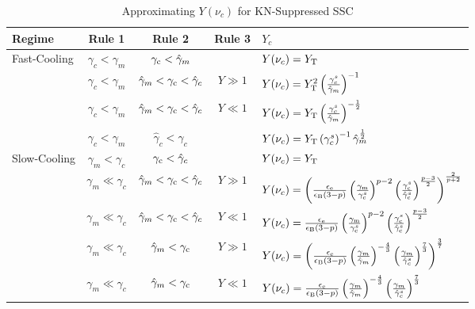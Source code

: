 \documentclass[fleqn,usenatbib]{mnras}
\begin{document}
\begin{table}
\centering
\caption{Approximating $Y(\nu_{c})$ for KN-Suppressed SSC}
\label{tab:Yckn}
\begin{tabular}{lcccl}
\hline
Regime&Rule 1&Rule 2&Rule 3&$Y_c$\\
\hline
Fast-Cooling &$ \gamma_{c} < \gamma_{m} $& $ \gamma_{\rm c} < \hat{\gamma}_{m} $& \ & $ Y(\nu_{c}) = Y_{\rm T}$\\
&$ \gamma_{c} < \gamma_{m} $ & $\hat{\gamma}_{m} < \gamma_{\rm c} < \hat{\gamma}_{c} $ & $ Y \gg 1$ & $ Y(\nu_{c}) = Y_{\rm T}^2 \left(\frac{\gamma_{c}^s}{\hat{\gamma}_{m}}\right)^{-1}$\\
&$ \gamma_{c} < \gamma_{m} $&$\hat{\gamma}_{m} < \gamma_{\rm c} < \hat{\gamma}_{c} $&$ Y \ll 1$&$ Y(\nu_{c}) = Y_{\rm T} \left(\frac{\gamma_{c}^s}{\hat{\gamma}_{m}}\right)^{-\frac{1}{2}}$\\
&$ \gamma_{c} < \gamma_{m}$ &$ \hat{\gamma}_{c} < \gamma_{c}$ & \ &$Y (\nu_{c}) = Y_{\rm T}\left(\gamma_{c}^s\right)^{-1}\hat{\gamma}_{m}^{\frac{1}{2}}$ \\
Slow-Cooling &$ \gamma_{m} < \gamma_{c}$ &$ \gamma_{\rm c} < \hat{\gamma}_{c}$& \ &$ Y(\nu_{c}) = Y_{\rm T} $\\
&$ \gamma_{m} \ll \gamma_{c}$ &$\hat{\gamma}_{m} < \gamma_{\rm c} < \hat{\gamma}_{c}$ &$Y\gg1$ &$Y(\nu_{c})=\left(\frac{\epsilon_{\rm e}}{\epsilon_{\rm B}(3-p)}\left(\frac{\gamma_{\rm m}}{\gamma_{\rm c}^s}\right)^{p-2}\left(\frac{\gamma_{\rm c}^s}{\hat{\gamma}_{\rm c}^s}\right)^{\frac{p-3}{2}}\right)^\frac{2}{p+2}$ \\
&$ \gamma_{m} \ll \gamma_{c}$ &$\hat{\gamma}_{m} < \gamma_{\rm c} < \hat{\gamma}_{c}$ &$ Y \ll 1$ &$Y(\nu_{c})=\frac{\epsilon_{\rm e}}{\epsilon_{\rm B}(3-p)}\left(\frac{\gamma_{\rm m}}{\gamma_{\rm c}^s}\right)^{p-2}\left(\frac{\gamma_{\rm c}^s}{\hat{\gamma}_{\rm c}^s}\right)^{\frac{p-3}{2}}$ \\
&$ \gamma_{m} \ll \gamma_{c}$ &$\hat{\gamma}_{m} < \gamma_{\rm c}$&$Y \gg 1$&$Y(\nu_{c}) = \left(\frac{\epsilon_{\rm e}}{\epsilon_{\rm B} (3-p)}\left(\frac{\gamma_{m}}{\hat{\gamma}_{m}}\right)^{-\frac{4}{3}}\left(\frac{\gamma_{m}}{\hat{\gamma}_{c}^s}\right)^{\frac{7}{3}}\right)^{\frac{3}{7}}$\\
&$ \gamma_{m} \ll \gamma_{c}$ &$\hat{\gamma}_{m} < \gamma_{\rm c}$&$Y \ll 1$&$Y(\nu_{c}) = \frac{\epsilon_{\rm e}}{\epsilon_{\rm B} (3-p)}\left(\frac{\gamma_{m}}{\hat{\gamma}_{m}}\right)^{-\frac{4}{3}}\left(\frac{\gamma_{m}}{\hat{\gamma}_{c}^s}\right)^{\frac{7}{3}}$\\
\hline
\end{tabular}
\end{table}
\end{document}
